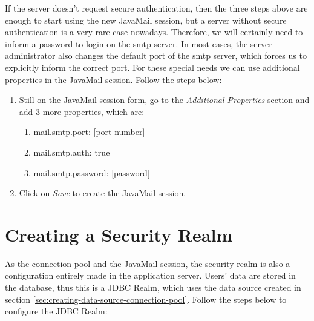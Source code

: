 \documentclass[envcountsame,envcountchap]{svmono}
\begin{document}
If the server doesn't request secure authentication, then the three steps above are enough to start using the new JavaMail session, but a server without secure authentication is a very rare case nowadays. Therefore, we will certainly need to inform a password to login on the smtp server. In most cases, the server administrator also changes the default port of the smtp server, which forces us to explicitly inform the correct port. For these special needs we can use additional properties in the JavaMail session. Follow the steps below:

\begin{enumerate}
\item Still on the JavaMail session form, go to the \textit{Additional Properties} section and add 3 more properties, which are:
   \begin{enumerate}
   \item mail.smtp.port: [port-number]
   \item mail.smtp.auth: true
   \item mail.smtp.password: [password]
   \end{enumerate}
\item Click on \textit{Save} to create the JavaMail session.
\end{enumerate}

\section{Creating a Security Realm}

As the connection pool and the JavaMail session, the security realm is also a configuration entirely made in the application server. Users' data are stored in the database, thus this is a JDBC Realm, which uses the data source created in section \ref{sec:creating-data-source-connection-pool}. Follow the steps below to configure the JDBC Realm: 
\end{document}
